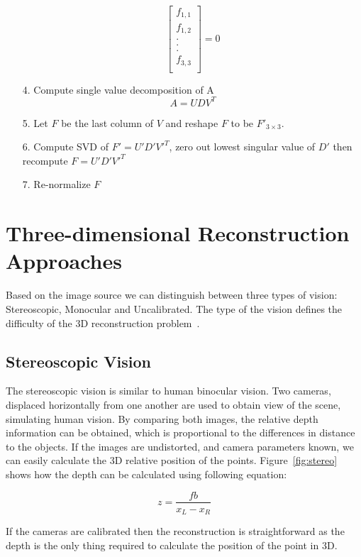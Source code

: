 \begin{itemize}
\begin{equation}
		\begin{bmatrix}
			f_{1,1} \\
			f_{1,2} \\
			. \\
			. \\
			. \\
			f_{3,3} \\
		\end{bmatrix}
		= 0
	\end{equation}
	\item[4.] Compute single value decomposition of A
		\begin{equation}
			A = UDV^T
		\end{equation}
	\item[5.] Let $F$ be the last column of $V$ and reshape $F$ to be  $F'_{3 \times 3}$.
	\item[6.] Compute SVD of $F'=U'D'V'^T$, zero out lowest singular value of $D'$ then recompute $F = U'D'V'^T$
	\item[7.] Re-normalize $F$
\end{itemize}

\section{Three-dimensional Reconstruction Approaches}
Based on the image source we can distinguish between three types of vision: Stereoscopic, Monocular and Uncalibrated. The type of the vision defines the difficulty of the 3D reconstruction problem~\cite{book:multiple_view_geometry}.

\subsection*{Stereoscopic Vision}
The stereoscopic vision is similar to human binocular vision. Two cameras, displaced horizontally from one another are used to obtain view of the scene, simulating human vision. By comparing both images, the relative depth information can be obtained, which is proportional to the differences in distance to the objects. If the images are undistorted, and camera parameters known, we can easily calculate the 3D relative position of the points. Figure~\ref{fig:stereo} shows how the depth can be calculated using following equation:

\begin{equation}
	z=\frac{f b}{x_L - x_R}
\end{equation}

If the cameras are calibrated then the reconstruction is straightforward as the depth is the only thing required to calculate the position of the point in 3D.

